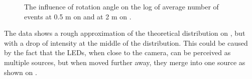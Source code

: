 \begin{figure}[htbp]
	\centering
	\caption{
  The influence of rotation angle on the log of average number of events at 0.5 m on  and at 2 m on .
  }
	\label{fig:angles}
\end{figure}

The data shows a rough approximation of the theoretical distribution on ,
but with a drop of intensity at the middle of the distribution. This could be caused
by the fact that the LEDs, when close to the camera, can be perceived as multiple sources,
but when moved further away, they merge into one source as shown on .

